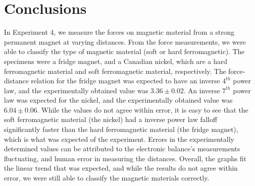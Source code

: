 \documentclass[letterpaper]{article}
\begin{document}
%
%


\section{Conclusions}
In Experiment 4, we measure the forces on magnetic material from a strong permanent magnet at varying distances.
From the force measurements, we were able to classify the type
of magnetic material (soft or hard ferromagnetic). The specimens were a fridge magnet, and a Canadian nickel, which are
a hard ferromagnetic material and soft ferromagnetic material, respectively.
The force-distance relation for the fridge magnet was expected to have an inverse $4^{th}$ power law, and the experimentally obtained
value was $3.36\pm0.02$.
An inverse $7^{th}$ power law was expected for the nickel, and the experimentally obtained value was $6.04\pm0.06$.
While the values do not agree within error, it is easy to see that the soft ferromagnetic material (the nickel) had a inverse power law
falloff significantly faster than the hard ferromagnetic material (the fridge magnet), which is what was expected of the experiment.
Errors in the experimentally determined values can be attributed to the electronic balance's measurements fluctuating, and
human error in measuring the distances. Overall, the graphs fit the linear trend that was expected, and while the
results do not agree within error, we were still able to classify the magnetic materials correctly.


% 
\end{document}

